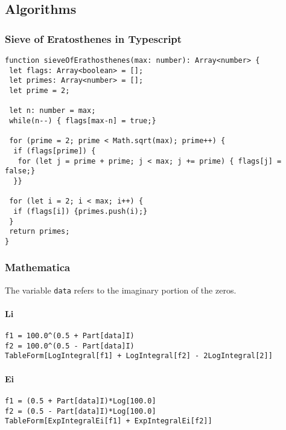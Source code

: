 \subsection{Algorithms}
\subsubsection{Sieve of Eratosthenes in Typescript} \label{ap:Sieve}

\begin{verbatim}
function sieveOfErathosthenes(max: number): Array<number> {
 let flags: Array<boolean> = [];
 let primes: Array<number> = [];
 let prime = 2;

 let n: number = max;
 while(n--) { flags[max-n] = true;}

 for (prime = 2; prime < Math.sqrt(max); prime++) {
  if (flags[prime]) {
   for (let j = prime + prime; j < max; j += prime) { flags[j] = false;}
  }}

 for (let i = 2; i < max; i++) {
  if (flags[i]) {primes.push(i);}
 }
 return primes;
}
\end{verbatim}

\subsubsection{Mathematica}
The variable \verb|data| refers to the imaginary portion of the zeros\citep{UMNZetaZeros}.
\paragraph{Li} \label{ap:MathematicaLi}
\begin{verbatim}
f1 = 100.0^(0.5 + Part[data]I)
f2 = 100.0^(0.5 - Part[data]I)
TableForm[LogIntegral[f1] + LogIntegral[f2] - 2LogIntegral[2]]
\end{verbatim}
\paragraph{Ei} \label{ap:MathematicaEi}
\begin{verbatim}
f1 = (0.5 + Part[data]I)*Log[100.0]
f2 = (0.5 - Part[data]I)*Log[100.0]
TableForm[ExpIntegralEi[f1] + ExpIntegralEi[f2]]
\end{verbatim}
